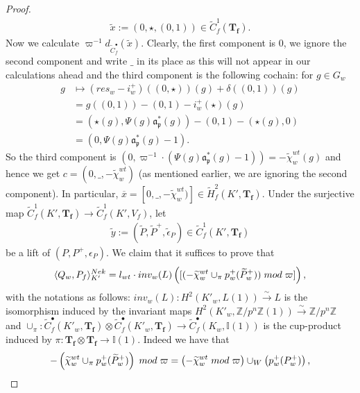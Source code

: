 \documentclass[reqno,10pt]{amsart}
\newcommand{\z}{\mathbb{Z}}
\newcommand{\I}{\mathbb{I}}
\newcommand{\f}{\mathbf{f}}
\newcommand{\T}{\mathbf{T}}
\newcommand{\ma}{\mathfrak{a}}
\newcommand{\p}{\mathfrak{p}}
\newcommand{\vp}{\varpi}
\newcommand{\ox}{\overline{x}}
\newcommand{\wx}{\widetilde{x}}
\newcommand{\wy}{\widetilde{y}}
\theoremstyle{plain}
\theoremstyle{definition}
\begin{document}
\begin{proof}
    \begin{align*}
        \wx := (0,\star,(0,1)) \in \widetilde{C}^1_f(\T_\f).
    \end{align*}
     Now we calculate $\vp^{-1}d_{\widetilde{C}^\bullet_f}(\wx)$. Clearly, the first component is 0, we ignore the second component and write $\_$ in its place as this will not appear in our calculations ahead and the third component is the following cochain: for $g \in G_w$
    \begin{align*}
        g & \mapsto (res_w - i_w^+)((0,\star))(g) + \delta((0,1))(g)\\
        & = g((0,1)) - (0,1) - i_w^+(\star)(g) \\
        & = (\star(g),\Psi(g)\ma_\p^*(g)) - (0,1) - (\star(g),0) \\
        & = (0,\Psi(g)\ma_\p^*(g)-1).
    \end{align*}
    So the third component is $(0,\vp^{-1} \cdot (\Psi(g)\ma_\p^*(g)-1)) = -\widetilde{\chi}_w^{wt}(g)$ and hence we get $c = (0,\_,-\widetilde{\chi}_w^{wt})$ (as mentioned earlier, we are ignoring the second component). In particular, $\ox = [0,\_,-\widetilde{\chi}_w^{wt})] \in \widetilde{H}^2_f(K',\T_\f)$. Under the surjective map $\widetilde{C}^1_f(K',\T_\f) \rightarrow \widetilde{C}^1_f(K',V_f)$, let
    \begin{align*}
        \wy := (\widetilde{P},\widetilde{P}^+,\widetilde{\epsilon}_P) \in \widetilde{C}^1_f(K',\T_\f)
    \end{align*}
    be a lift of $(P,P^+,\epsilon_P).$ We claim that it suffices to prove that 
    \begin{align} \label{ClaimInLemma7.7}
        \langle Q_w,P_f \rangle^{Nek}_{K'} = l_{wt} \cdot inv_w(L)\left([(-\widetilde{\chi}_w^{wt} \cup_\pi p_w^+(\widetilde{P}_w^+)) \hspace{1mm} mod \hspace{1mm} \vp] \right),
    \end{align}
    with the notations as follows: $inv_w(L) : H^2(K'_w,L(1)) \xrightarrow{\sim} L$ is the isomorphism induced by the invariant maps $H^2(K'_w,\z/p^n\z(1)) \xrightarrow{\sim} \z/p^n\z$ and $\cup_\pi : \widetilde{C}^\bullet_f(K'_w,\T_\f) \otimes \widetilde{C}^\bullet_f(K'_w,\T_\f) \rightarrow \widetilde{C}^\bullet_f(K_w,\I(1))$ is the cup-product induced by $\pi: \T_\f \otimes \T_\f \rightarrow \I(1)$. Indeed we have that 
    \begin{align*}
        -\left(\widetilde{\chi}_w^{wt} \cup_\pi p_w^+(\widetilde{P}_w^+) \right) \hspace{1mm} mod \hspace{1mm} \vp = \left(-\widetilde{\chi}_w^{wt} \hspace{1mm} mod \hspace{1mm} \vp \right) \cup_W \left(p_w^+(P_w^+) \right),

\end{align*}
\end{proof}
\end{document}
